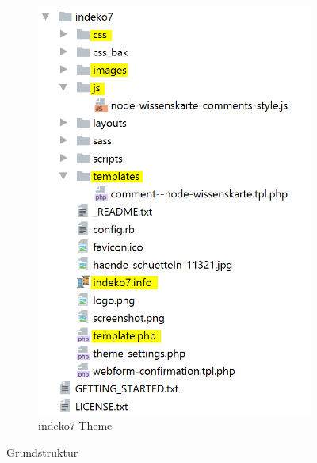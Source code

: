\begin{figure}[!h]
\begin{subfigure}[A]{0.4\textwidth}
		\includegraphics[height=0.25\textheight]{images/structure_theme}
		\caption[]{indeko7 Theme}
		\label{fig:structuretheme}
	\end{subfigure}
	\caption[]{Grundstruktur}
	\label{fig:structure}
\end{figure}


